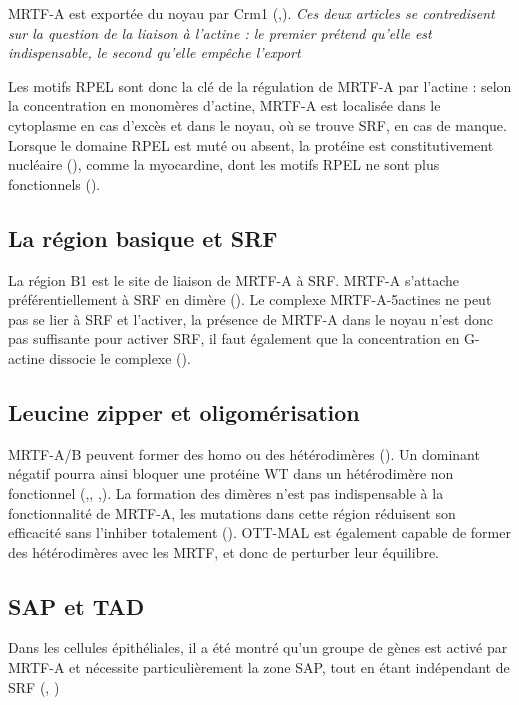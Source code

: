 \documentclass{article}
\begin{document}
 MRTF-A est exportée du noyau par Crm1 (\cite{vartiainen_nuclear_2007},\cite{hayashi_differences_2013}). \emph{Ces deux articles se contredisent sur la question de la liaison à l'actine : le premier prétend qu'elle est indispensable, le second qu'elle empêche l'export} 
 
 Les motifs RPEL sont donc la clé de la régulation de MRTF-A par l'actine : selon la concentration en monomères d'actine, MRTF-A est localisée dans le cytoplasme en cas d'excès et dans le noyau, où se trouve SRF, en cas de manque. Lorsque le domaine RPEL est muté ou absent, la protéine est constitutivement nucléaire (\cite{miralles_actin_2003}), comme la myocardine, dont les motifs RPEL ne sont plus fonctionnels (\cite{guettler_rpel_2008}). 
 
 \subsection{La région basique et SRF}
 La région B1 est le site de liaison de MRTF-A à SRF. MRTF-A s'attache préférentiellement à SRF en dimère (\cite{miralles_actin_2003}). Le complexe MRTF-A-5actines ne peut pas se lier à SRF et l'activer, la présence de MRTF-A dans le noyau n'est donc pas suffisante pour activer SRF, il faut également que la concentration en G-actine dissocie le complexe (\cite{vartiainen_nuclear_2007}). 
 \subsection{Leucine zipper et oligomérisation}
 MRTF-A/B peuvent former des homo ou des hétérodimères (\cite{miralles_actin_2003}). Un dominant négatif pourra ainsi bloquer une protéine WT dans un hétérodimère non fonctionnel (\cite{selvaraj_megakaryoblastic_2003},\cite{cen_myocardin/mkl_2004}, \cite{li_requirement_2005},\cite{rajakyla_actin-regulated_2010}). La formation des dimères n'est pas indispensable à la fonctionnalité de MRTF-A, les mutations dans cette région réduisent son efficacité sans l'inhiber totalement (\cite{selvaraj_megakaryoblastic_2003}). 
 OTT-MAL est également capable de former des hétérodimères avec les MRTF, et donc de perturber leur équilibre. 
 
 \subsection{SAP et TAD}
 
Dans les cellules épithéliales, il a été montré qu'un groupe de gènes est activé par MRTF-A et nécessite particulièrement la zone SAP, tout en étant indépendant de SRF (\cite{asparuhova_transcriptional_2011}, \cite{gurbuz_sap_2014}) 
 
\end{document}
